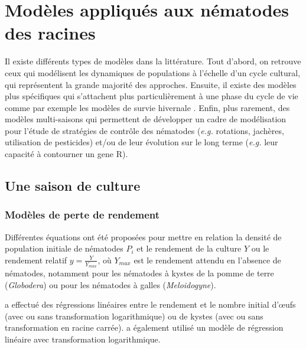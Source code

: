 \section{Modèles appliqués aux nématodes des racines}
\label{sec:modeles-nematodes}
	
	Il existe différents  types de modèles dans la littérature. Tout d'abord, on retrouve ceux qui modélisent les dynamiques de populations à l’échelle d'un cycle cultural, qui représentent la grande majorité des approches. Ensuite, il existe  des modèles plus spécifiques qui s'attachent plus particulièrement à une phase du cycle de vie comme par exemple les modèles de survie hivernale \citep{Jeger1985, Starr1985, Jeger1993} . Enfin, plus rarement,  des  modèles multi-saisons qui permettent de développer un cadre de modélisation pour l'étude de stratégies de contrôle des nématodes  (\textit{e.g.} rotations, jachères, utilisation de pesticides) et/ou de leur évolution sur le long terme (\textit{e.g.} leur capacité à contourner un \gls{gene R}). 
	
	
\subsection{Une saison  de culture}
\label{sec:une-saison}
	
	
\subsubsection{Modèles de perte de rendement}
\label{sec:perte-de-rendements}
	
	Différentes équations ont été proposées pour mettre en relation la densité de population initiale de nématodes $P_i$ et le rendement de la culture $Y$ ou  le rendement relatif $y=\frac{Y}{Y_{max}}$, où $Y_{max}$ est le rendement attendu en l'absence de nématodes, notamment pour les nématodes à kystes de la pomme de terre (\textit{Globodera}) ou pour les nématodes à galles (\textit{Meloidogyne}).
	
	\citet{Brown1969} a effectué des régressions linéaires entre le rendement et le nombre initial d'œufs (avec ou sans transformation logarithmique) ou de kystes (avec ou sans transformation en racine carrée). \citet{Oostenbrink1966} a également utilisé un modèle de régression linéaire avec transformation logarithmique. %
	
